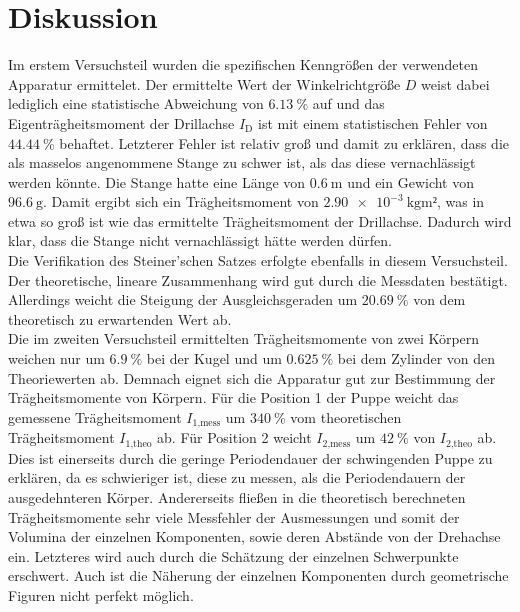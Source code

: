 \section{Diskussion}
\label{sec:Diskussion}

Im erstem Versuchsteil wurden die spezifischen Kenngrößen der verwendeten 
Apparatur ermittelet. Der ermittelte Wert der Winkelrichtgröße $D$ weist dabei 
lediglich eine statistische Abweichung von $\SI{6.13}{\percent}$ auf und das 
Eigenträgheitsmoment der Drillachse $I_\text{D}$ ist mit einem statistischen 
Fehler von $\SI{44.44}{\percent}$ behaftet. Letzterer Fehler ist relativ groß 
und damit zu erklären, dass die als masselos angenommene Stange zu 
schwer ist, als das diese vernachlässigt werden könnte. Die Stange hatte eine 
Länge von $\SI{0.6}{\meter}$ und ein Gewicht von $\SI{96.6}{\gram}$. Damit ergibt
sich ein Trägheitsmoment von $\SI{2.90e-3}{\kilo\gram\meter²}$, was in etwa so groß
ist wie das ermittelte Trägheitsmoment der Drillachse. Dadurch wird klar, dass die
Stange nicht vernachlässigt hätte werden dürfen. \\
Die Verifikation des Steiner’schen Satzes erfolgte ebenfalls in diesem Versuchsteil. Der
theoretische, lineare Zusammenhang wird gut durch die Messdaten bestätigt. Allerdings weicht
die Steigung der Ausgleichsgeraden um $\SI{20.69}{\percent}$ von dem theoretisch zu erwartenden 
Wert ab. \\
Die im zweiten Versuchsteil ermittelten Trägheitsmomente von zwei Körpern weichen nur um
$\SI{6.9}{\percent}$ bei der Kugel und um $\SI{0.625}{\percent}$ bei dem Zylinder von den 
Theoriewerten ab. Demnach eignet sich die Apparatur gut zur Bestimmung der Trägheitsmomente
von Körpern. 
Für die Position 1 der Puppe weicht das gemessene Trägheitsmoment $I_\text{1,mess}$ um 
$\SI{340}{\percent}$ vom theoretischen Trägheitsmoment $I_\text{1,theo}$ ab. Für Position 2
weicht $I_\text{2,mess}$ um $\SI{42}{\percent}$ von $I_\text{2,theo}$ ab.
Dies ist einerseits durch die geringe Periodendauer der schwingenden Puppe zu erklären,
da es schwieriger ist, diese zu messen, als die Periodendauern der ausgedehnteren Körper.
Andererseits fließen in die theoretisch berechneten Trägheitsmomente sehr viele Messfehler
der Ausmessungen und somit der Volumina der einzelnen Komponenten, sowie deren Abstände 
von der Drehachse ein.
Letzteres wird auch durch die Schätzung der einzelnen Schwerpunkte erschwert. 
Auch ist die Näherung der einzelnen Komponenten durch geometrische Figuren nicht
perfekt möglich.
